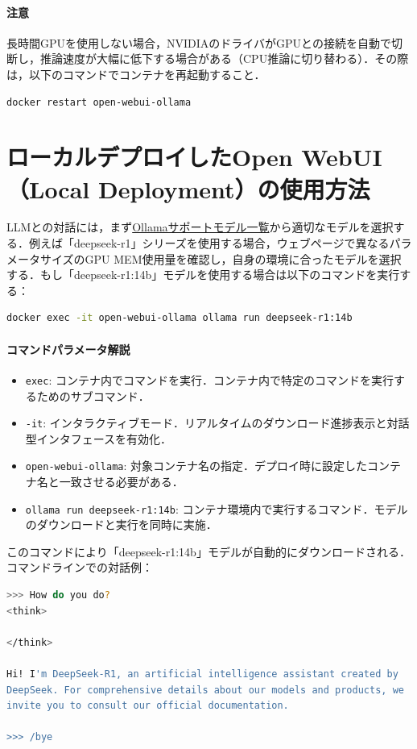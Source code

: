 \paragraph{注意} 長時間GPUを使用しない場合，NVIDIAのドライバがGPUとの接続を自動で切断し，推論速度が大幅に低下する場合がある（CPU推論に切り替わる）．その際は，以下のコマンドでコンテナを再起動すること．
\begin{lstlisting}[language=bash]
docker restart open-webui-ollama
\end{lstlisting}

\section{ローカルデプロイしたOpen WebUI（Local Deployment）の使用方法}
LLMとの対話には，まず\href{https://ollama.com/search}{Ollamaサポートモデル一覧}から適切なモデルを選択する．例えば「deepseek-r1」シリーズを使用する場合，ウェブページで異なるパラメータサイズのGPU MEM使用量を確認し，自身の環境に合ったモデルを選択する．もし「deepseek-r1:14b」モデルを使用する場合は以下のコマンドを実行する：

\begin{lstlisting}[language=bash]
docker exec -it open-webui-ollama ollama run deepseek-r1:14b
\end{lstlisting}

\paragraph{コマンドパラメータ解説}
\begin{itemize}
\item \texttt{exec}: コンテナ内でコマンドを実行．コンテナ内で特定のコマンドを実行するためのサブコマンド．
\item \texttt{-it}: インタラクティブモード．リアルタイムのダウンロード進捗表示と対話型インタフェースを有効化．
\item \texttt{open-webui-ollama}: 対象コンテナ名の指定．デプロイ時に設定したコンテナ名と一致させる必要がある．
\item \texttt{ollama run deepseek-r1:14b}: コンテナ環境内で実行するコマンド．モデルのダウンロードと実行を同時に実施．
\end{itemize}

このコマンドにより「deepseek-r1:14b」モデルが自動的にダウンロードされる．コマンドラインでの対話例：
\begin{lstlisting}[language=bash]
% docker exec -it open-webui-ollama ollama run deepseek-r1:14b
>>> How do you do?
<think>

</think>

Hi! I'm DeepSeek-R1, an artificial intelligence assistant created by
DeepSeek. For comprehensive details about our models and products, we
invite you to consult our official documentation.

>>> /bye
\end{lstlisting}


